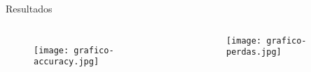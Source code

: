 \begin{frame}[t]{Resultados}
    \begin{columns}
            \vspace{0.4cm}
            \begin{figure}
                \texttt{[image: grafico-accuracy.jpg]}
            \end{figure}
        \begin{center}
            \vspace{0.4cm}
            \begin{figure}
                \texttt{[image: grafico-perdas.jpg]}
            \end{figure}    
        \end{center}
            
    \end{columns}
\end{frame}

